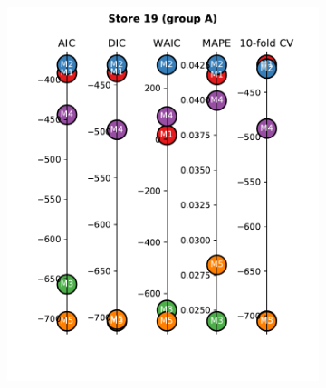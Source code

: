 \documentclass[english, 12pt, a4paper, sci, utf8, a-1b, online]{aaltothesis}
\begin{document}
\begin{abstractpage}[english]
\begin{figure}[hbt]
\begin{subfigure}[htb]{0.3\textwidth}
		\includegraphics[width=\textwidth]{../plots/metrics/metrics_plot_single_store_19_of_A.pdf}
	\end{subfigure}
	\hfill
	\begin{subfigure}[htb]{0.3\textwidth}
		\centering

\end{subfigure}
\end{figure}
\end{abstractpage}
\end{document}
